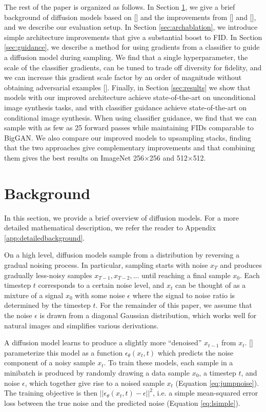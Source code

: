 \documentclass{article}
\newcommand{\shortcite}[1]{[\citenum{#1}]}
\newcommand{\namecite}[1]{\citeauthor{#1} [\citenum{#1}]}
\begin{document}
The rest of the paper is organized as follows. In Section \ref{sec:background}, we give a brief background of diffusion models based on \namecite{ddpm} and the improvements from \namecite{improved} and \namecite{ddim}, and we describe our evaluation setup. In Section \ref{sec:archablation}, we introduce simple architecture improvements that give a substantial boost to FID. In Section \ref{sec:guidance}, we describe a method for using gradients from a classifier to guide a diffusion model during sampling. We find that a single hyperparameter, the scale of the classifier gradients, can be tuned to trade off diversity for fidelity, and we can increase this gradient scale factor by an order of magnitude without obtaining adversarial examples \shortcite{adversarialexamples}.
Finally, in Section \ref{sec:results} we show that models with our improved architecture achieve state-of-the-art on unconditional image synthesis tasks, and with classifier guidance achieve state-of-the-art on conditional image synthesis. When using classifier guidance, we find that we can sample with as few as 25 forward passes while maintaining FIDs comparable to BigGAN. We also compare our improved models to upsampling stacks, finding that the two approaches give complementary improvements and that combining them gives the best results on ImageNet 256$\times$256 and 512$\times$512.

\section{Background}
\label{sec:background}
In this section, we provide a brief overview of diffusion models. For a more detailed mathematical description, we refer the reader to Appendix \ref{app:detailedbackground}.

On a high level, diffusion models sample from a distribution by reversing a gradual noising process. In particular, sampling starts with noise $x_T$ and produces gradually less-noisy samples $x_{T-1},x_{T-2},...$ until reaching a final sample $x_0$. Each timestep $t$ corresponds to a certain noise level, and $x_t$ can be thought of as a mixture of a signal $x_0$ with some noise $\epsilon$ where the signal to noise ratio is determined by the timestep $t$. For the remainder of this paper, we assume that the noise $\epsilon$ is drawn from a diagonal Gaussian distribution, which works well for natural images and simplifies various derivations.

A diffusion model learns to produce a slightly more ``denoised'' $x_{t-1}$ from $x_{t}$. \namecite{ddpm} parameterize this model as a function $\epsilon_{\theta}(x_t,t)$ which predicts the noise component of a noisy sample $x_t$. To train these models, each sample in a minibatch is produced by randomly drawing a data sample $x_0$, a timestep $t$, and noise $\epsilon$, which together give rise to a noised sample $x_t$ (Equation \ref{eq:jumpnoise}). 
The training objective is then $||\epsilon_{\theta}(x_t,t) - \epsilon||^2$, i.e. a simple mean-squared error loss between the true noise and the predicted noise (Equation \ref{eq:lsimple}). 
\end{document}
